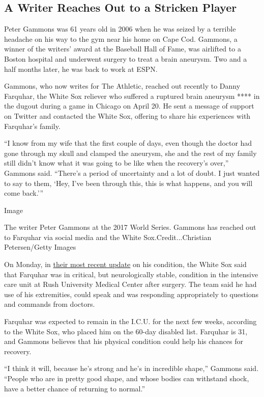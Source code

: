 \hypertarget{a-writer-reaches-out-to-a-stricken-player}{%
\subsection{A Writer Reaches Out to a Stricken
Player}\label{a-writer-reaches-out-to-a-stricken-player}}

Peter Gammons was 61 years old in 2006 when he was seized by a terrible
headache on his way to the gym near his home on Cape Cod. Gammons, a
winner of the writers' award at the Baseball Hall of Fame, was airlifted
to a Boston hospital and underwent surgery to treat a brain aneurysm.
Two and a half months later, he was back to work at ESPN.

Gammons, who now writes for The Athletic, reached out recently to Danny
Farquhar, the White Sox reliever who suffered a ruptured brain aneurysm
**** in the dugout during a game in Chicago on April 20. He sent a
message of support on Twitter and contacted the White Sox, offering to
share his experiences with Farquhar's family.

``I know from my wife that the first couple of days, even though the
doctor had gone through my skull and clamped the aneurysm, she and the
rest of my family still didn't know what it was going to be like when
the recovery's over,'' Gammons said. ``There's a period of uncertainty
and a lot of doubt. I just wanted to say to them, `Hey, I've been
through this, this is what happens, and you will come back.'''

Image

The writer Peter Gammons at the 2017 World Series. Gammons has reached
out to Farquhar via social media and the White Sox.Credit...Christian
Petersen/Getty Images

On Monday, in
\href{https://twitter.com/whitesox/status/988497873217228803}{their most
recent update} on his condition, the White Sox said that Farquhar was in
critical, but neurologically stable, condition in the intensive care
unit at Rush University Medical Center after surgery. The team said he
had use of his extremities, could speak and was responding appropriately
to questions and commands from doctors.

Farquhar was expected to remain in the I.C.U. for the next few weeks,
according to the White Sox, who placed him on the 60-day disabled list.
Farquhar is 31, and Gammons believes that his physical condition could
help his chances for recovery.

``I think it will, because he's strong and he's in incredible shape,''
Gammons said. ``People who are in pretty good shape, and whose bodies
can withstand shock, have a better chance of returning to normal.''

